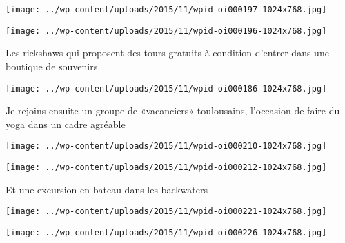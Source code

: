  

\begin{center} \texttt{[image: ../wp-content/uploads/2015/11/wpid-oi000197-1024x768.jpg]} \end{center}

 

 

\begin{center} \texttt{[image: ../wp-content/uploads/2015/11/wpid-oi000196-1024x768.jpg]} \end{center}

 

 Les rickshaws qui proposent des tours gratuits à condition d'entrer dans une boutique de souvenirs 

 

\begin{center} \texttt{[image: ../wp-content/uploads/2015/11/wpid-oi000186-1024x768.jpg]} \end{center}

 

 Je rejoins ensuite un groupe de «vacanciers» toulousains, l'occasion de faire du yoga dans un cadre agréable 

 

\begin{center} \texttt{[image: ../wp-content/uploads/2015/11/wpid-oi000210-1024x768.jpg]} \end{center}

 

 

\begin{center} \texttt{[image: ../wp-content/uploads/2015/11/wpid-oi000212-1024x768.jpg]} \end{center}

 

 Et une excursion en bateau dans les backwaters 

 

\begin{center} \texttt{[image: ../wp-content/uploads/2015/11/wpid-oi000221-1024x768.jpg]} \end{center}

 

 

\begin{center} \texttt{[image: ../wp-content/uploads/2015/11/wpid-oi000226-1024x768.jpg]} \end{center}

